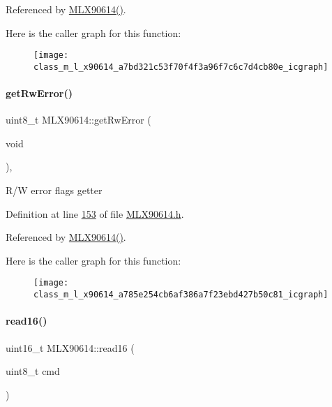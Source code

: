 Referenced by \mbox{\hyperlink{_m_l_x90614_8cpp_source_l00046}{M\+L\+X90614()}}.

Here is the caller graph for this function\+:\nopagebreak
\begin{figure}[H]
\begin{center}
\leavevmode
\texttt{[image: class\_m\_l\_x90614\_a7bd321c53f70f4f3a96f7c6c7d4cb80e\_icgraph]}
\end{center}
\end{figure}
\mbox{\label{class_m_l_x90614_a785e254cb6af386a7f23ebd427b50c81}} 
\paragraph{\texorpdfstring{get\+Rw\+Error()}{getRwError()}}
{\footnotesize\ttfamily uint8\+\_\+t M\+L\+X90614\+::get\+Rw\+Error (\begin{DoxyParamCaption}\item[{void}]{ }\end{DoxyParamCaption})\hspace{0.3cm}{\ttfamily [inline]}, {\ttfamily [private]}}

R/W error flags getter 

Definition at line \mbox{\hyperlink{_m_l_x90614_8h_source_l00153}{153}} of file \mbox{\hyperlink{_m_l_x90614_8h_source}{M\+L\+X90614.\+h}}.



Referenced by \mbox{\hyperlink{_m_l_x90614_8cpp_source_l00046}{M\+L\+X90614()}}.

Here is the caller graph for this function\+:\nopagebreak
\begin{figure}[H]
\begin{center}
\leavevmode
\texttt{[image: class\_m\_l\_x90614\_a785e254cb6af386a7f23ebd427b50c81\_icgraph]}
\end{center}
\end{figure}
\mbox{\label{class_m_l_x90614_ad7fb030682918c5c9ae6292962527b44}} 
\paragraph{\texorpdfstring{read16()}{read16()}}
{\footnotesize\ttfamily uint16\+\_\+t M\+L\+X90614\+::read16 (\begin{DoxyParamCaption}\item[{uint8\+\_\+t}]{cmd }\end{DoxyParamCaption})\hspace{0.3cm}{\ttfamily [private]}}



